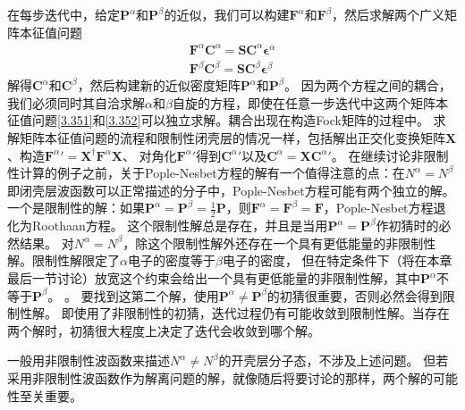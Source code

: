在每步迭代中，给定$\mathbf{P}^\alpha$和$\mathbf{P}^\beta$的近似，我们可以构建$\mathbf{F}^\alpha$和$\mathbf{F}^\beta$，然后求解两个广义矩阵本征值问题
\begin{align}
	\mathbf{F}^\alpha\mathbf{C}^\alpha = \mathbf{S}\mathbf{C}^\alpha\bm{\epsilon}^\alpha \label{3.351}\\
	\mathbf{F}^\beta\mathbf{C}^\beta = \mathbf{S}\mathbf{C}^\beta\bm{\epsilon}^\beta \label{3.352}
\end{align}
解得$\mathbf{C}^\alpha$和$\mathbf{C}^\beta$，然后构建新的近似密度矩阵$\mathbf{P}^\alpha$和$\mathbf{P}^\beta$。
因为两个方程之间的耦合，我们必须同时其自洽求解$\alpha$和$\beta$自旋的方程，即使在任意一步迭代中这两个矩阵本征值问题\autoref{3.351}和\autoref{3.352}可以独立求解。耦合出现在构造Fock矩阵的过程中。
求解矩阵本征值问题的流程和限制性闭壳层的情况一样，包括解出正交化变换矩阵$\mathbf{X}$、构造${\mathbf{F}^\alpha}'=\mathbf{X}^\dagger \mathbf{F}^\alpha\mathbf{X}$、
对角化${\mathbf{F}^\alpha}'$得到${\mathbf{C}^\alpha}'$以及$\mathbf{C}^\alpha=\mathbf{X}{\mathbf{C}^\alpha}'$。
在继续讨论非限制性计算的例子之前，关于Pople-Nesbet方程的解有一个值得注意的点：在$N^\alpha=N^\beta$即闭壳层波函数可以正常描述的分子中，Pople-Nesbet方程可能有两个独立的解。
一个是限制性的解：如果$\mathbf{P}^\alpha=\mathbf{P}^\beta=\frac{1}{2}\mathbf{P}$，则$\mathbf{F}^\alpha=\mathbf{F}^\beta=\mathbf{F}$，Pople-Nesbet方程退化为Roothaan方程。
这个限制性解总是存在，并且是当用$\mathbf{P}^\alpha=\mathbf{P}^\beta$作初猜时的必然结果。
对$N^\alpha=N^\beta$，除这个限制性解外还存在一个具有更低能量的非限制性解。限制性解限定了$\alpha$电子的密度等于$\beta$电子的密度，
但在特定条件下（将在本章最后一节讨论）放宽这个约束会给出一个具有更低能量的非限制性解，其中$\mathbf{P}^\alpha$不等于$\mathbf{P}^\beta$。
。
要找到这第二个解，使用$\mathbf{P}^\alpha\neq\mathbf{P}^\beta$的初猜很重要，否则必然会得到限制性解。
即使用了非限制性的初猜，迭代过程仍有可能收敛到限制性解。当存在两个解时，初猜很大程度上决定了迭代会收敛到哪个解。

一般用非限制性波函数来描述$N^\alpha\neq N^\beta$的开壳层分子态，不涉及上述问题。
但若采用非限制性波函数作为解离问题的解，就像随后将要讨论的那样，两个解的可能性至关重要。
